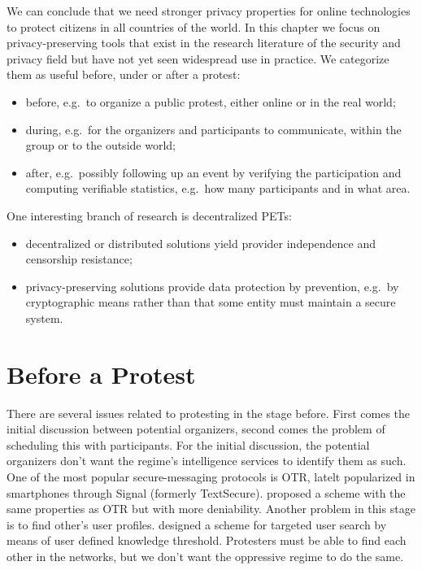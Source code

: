\documentclass[a4paper]{llncs}
\begin{document}
We can conclude that we need stronger privacy properties for online 
technologies to protect citizens in all countries of the world.
In this chapter we focus on privacy-preserving tools that exist in the research 
literature of the security and privacy field but have not yet seen widespread 
use in practice.
We categorize them as useful before, under or after a protest:
\begin{itemize}
  \item before, e.g.\ to organize a public protest, either online or in the 
    real world;
  \item during, e.g.\ for the organizers and participants to communicate, 
    within the group or to the outside world;
  \item after, e.g.\ possibly following up an event by verifying the 
    participation and computing verifiable statistics, e.g.\ how many 
    participants and in what area.
\end{itemize}

One interesting branch of research is decentralized \acp{PET}:
\begin{itemize}
  \item decentralized or distributed solutions yield provider independence and 
    censorship resistance;
  \item privacy-preserving solutions provide data protection by prevention, 
    e.g.\ by cryptographic means rather than that some entity must maintain 
    a secure system.
\end{itemize}

\section{Before a Protest}
\label{BeforeProtest}

There are several issues related to protesting in the stage before.
First comes the initial discussion between potential organizers, second comes 
the problem of scheduling this with participants.
For the initial discussion, the potential organizers don't want the regime's 
intelligence services to identify them as such.
One of the most popular secure-messaging protocols is \ac{OTR}, latelt 
popularized in smartphones through Signal (formerly TextSecure).
\citet{OTPKX} proposed a scheme with the same properties as \ac{OTR} but with 
more deniability.
Another problem in this stage is to find other's user profiles.
\citet{ThresholdUserSearch} designed a scheme for targeted user search by means 
of user defined knowledge threshold.
Protesters must be able to find each other in the networks, but we don't want 
the oppressive regime to do the same.
\end{document}
